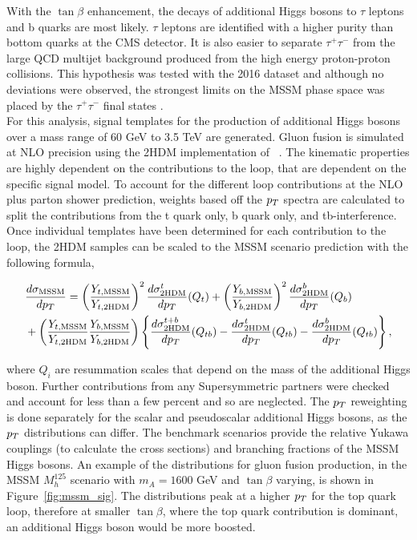 With the $\tan\beta$ enhancement, the decays of additional Higgs bosons to $\tau$ leptons and b quarks are most likely.
$\tau$ leptons are identified with a higher purity than bottom quarks at the CMS detector.
It is also easier to separate $\tau^{+}\tau^{-}$ from the large QCD multijet background produced from the high energy proton-proton collisions.
This hypothesis was tested with the 2016 dataset and although no deviations were observed, the strongest limits on the MSSM phase space was placed by the $\tau^+\tau^-$ final states \cite{CMS_MSSM_Tau_2018,Khachatryan:2015tra}. \\

For this analysis, signal templates for the production of additional Higgs bosons over a mass range of 60 GeV to 3.5 TeV are generated.
Gluon fusion is simulated at NLO precision using the 2HDM implementation of ~\cite{Nason:2004rx,Frixione:2007vw,Alioli:2010xd,Jezo:2015aia}.
The kinematic properties are highly dependent on the contributions to the loop, that are dependent on the specific signal model.
To account for the different loop contributions at the NLO plus parton shower prediction, weights based off the $p_{T}$ spectra are calculated to split the contributions from the t quark only, b quark only, and tb-interference.
Once individual templates have been determined for each contribution to the loop, the 2HDM samples can be scaled to the MSSM scenario prediction with the following formula,

\begin{align}
& \frac{d\sigma_{\text{MSSM}}}{dp_{T}}  = \left(\frac{Y_{t,\text{MSSM}}}{Y_{t,\text{2HDM}}}\right)^{2}\frac{d\sigma^{t}_{\text{2HDM}}}{dp_{T}}(Q_{t}) + \left(\frac{Y_{b,\text{MSSM}}}{Y_{b,\text{2HDM}}}\right)^{2}\frac{d\sigma^{b}_{\text{2HDM}}}{dp_{T}}(Q_{b}) \nonumber \\
& + \left(\frac{Y_{t,\text{MSSM}}}{Y_{t,\text{2HDM}}}\frac{Y_{b,\text{MSSM}}}{Y_{b,\text{2HDM}}}\right) \left\{ \frac{d\sigma^{t+b}_{\text{2HDM}}}{dp_{T}}(Q_{tb}) - \frac{d\sigma^{t}_{\text{2HDM}}}{dp_{T}}(Q_{tb}) - \frac{d\sigma^{b}_{\text{2HDM}}}{dp_{T}}(Q_{tb}) \right\} ,
\label{eqn:mssm_xs}
\end{align}
\vspace{0.2cm}

where $Q_i$ are resummation scales that depend on the mass of the additional Higgs boson.
Further contributions from any Supersymmetric partners were checked and account for less than a few percent and so are neglected.
The $p_{T}$ reweighting is done separately for the scalar and pseudoscalar additional Higgs bosons, as the $p_{T}$ distributions can differ.
The benchmark scenarios provide the relative Yukawa couplings (to calculate the cross sections) and branching fractions of the MSSM Higgs bosons.
An example of the distributions for gluon fusion production, in the MSSM $M_{h}^{125}$ scenario with $m_{A} = 1600$ GeV and $\tan\beta$ varying, is shown in Figure~\ref{fig:mssm_sig}.
The distributions peak at a higher $p_{T}$ for the top quark loop, therefore at smaller $\tan\beta$, where the top quark contribution is dominant, an additional Higgs boson would be more boosted. \\

